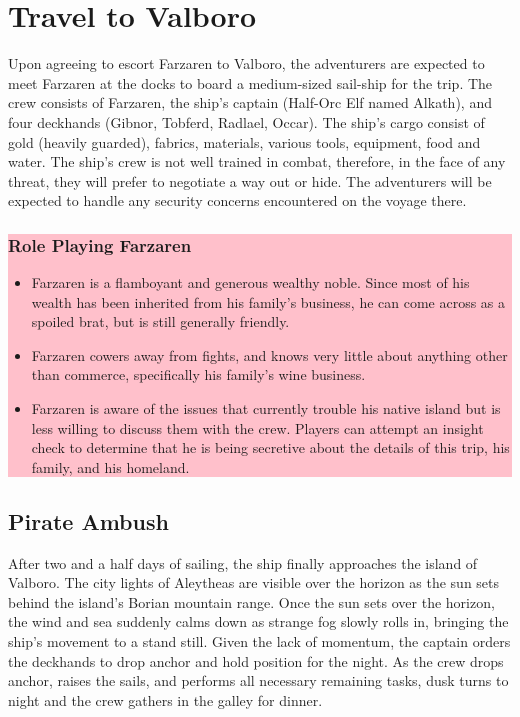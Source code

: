 
\section{Travel to Valboro}

\begin{multicols*}{2}
	
Upon agreeing to escort Farzaren to Valboro, the adventurers are expected to meet Farzaren at the docks to board a medium-sized sail-ship for the trip. The crew consists of Farzaren, the ship’s captain (Half-Orc Elf named Alkath), and four deckhands (Gibnor, Tobferd, Radlael, Occar). The ship’s cargo consist of gold (heavily guarded), fabrics, materials, various tools, equipment, food and water. The ship’s crew is not well trained in combat, therefore, in the face of any threat, they will prefer to negotiate a way out or hide. The adventurers will be expected to handle any security concerns encountered on the voyage there.\break

\colorbox{pink}{\begin{minipage}{0.4\textwidth}
\subsubsection*{Role Playing Farzaren}
\begin{itemize}
	\item Farzaren is a flamboyant and generous wealthy noble. Since most of his wealth has been inherited from his family's business, he can come across as a spoiled brat, but is still generally friendly. 
	\item Farzaren cowers away from fights, and knows very little about anything other than commerce, specifically his family's wine business.
	\item Farzaren is aware of the issues that currently trouble his native island but is less willing to discuss them with the crew. Players can attempt an insight check to determine that he is being secretive about the details of this trip, his family, and his homeland.
\end{itemize}
\end{minipage}}


\subsection*{Pirate Ambush}

After two and a half days of sailing, the ship finally approaches the island of Valboro. The city lights of Aleytheas are visible over the horizon as the sun sets behind the island’s Borian mountain range. Once the sun sets over the horizon, the wind and sea suddenly calms down as strange fog slowly rolls in, bringing the ship’s movement to a stand still. Given the lack of momentum, the captain orders the deckhands to drop anchor and hold position for the night. As the crew drops anchor, raises the sails, and performs all necessary remaining tasks, dusk turns to night and the crew gathers in the galley for dinner.


\end{multicols*}
